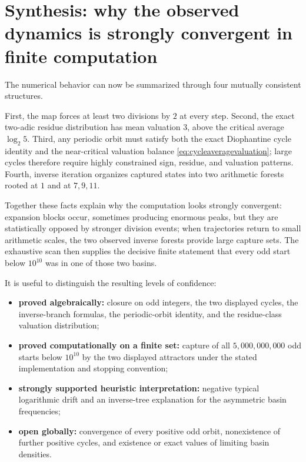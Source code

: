 \documentclass[11pt]{article}
\begin{document}
\section{Synthesis: why the observed dynamics is strongly convergent in finite computation}

The numerical behavior can now be summarized through four mutually consistent structures.

First, the map forces at least two divisions by $2$ at every step.  Second, the exact two-adic residue distribution has mean valuation $3$, above the critical average $\log_2 5$.  Third, any periodic orbit must satisfy both the exact Diophantine cycle identity and the near-critical valuation balance \eqref{eq:cycleaveragevaluation}; large cycles therefore require highly constrained sign, residue, and valuation patterns.  Fourth, inverse iteration organizes captured states into two arithmetic forests rooted at $1$ and at $7,9,11$.

Together these facts explain why the computation looks strongly convergent: expansion blocks occur, sometimes producing enormous peaks, but they are statistically opposed by stronger division events; when trajectories return to small arithmetic scales, the two observed inverse forests provide large capture sets.  The exhaustive scan then supplies the decisive finite statement that every odd start below $10^{10}$ was in one of those two basins.

It is useful to distinguish the resulting levels of confidence:
\begin{itemize}
\item \textbf{proved algebraically:} closure on odd integers, the two displayed cycles, the inverse-branch formulas, the periodic-orbit identity, and the residue-class valuation distribution;
\item \textbf{proved computationally on a finite set:} capture of all $5{,}000{,}000{,}000$ odd starts below $10^{10}$ by the two displayed attractors under the stated implementation and stopping convention;
\item \textbf{strongly supported heuristic interpretation:} negative typical logarithmic drift and an inverse-tree explanation for the asymmetric basin frequencies;
\item \textbf{open globally:} convergence of every positive odd orbit, nonexistence of further positive cycles, and existence or exact values of limiting basin densities.
\end{itemize}
\end{document}
